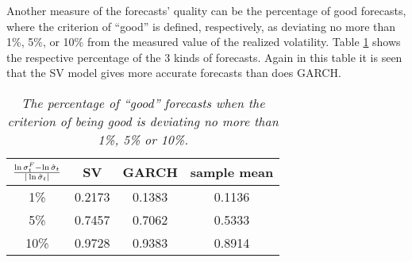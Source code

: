 Another measure of the forecasts' quality can be the percentage of good
forecasts, where the criterion of ``good'' is defined, respectively,
as deviating no more than 1\%, 5\%, or 10\% from the measured value of
the realized volatility. Table \ref{tab:nordea_2012_good} shows the
respective percentage of the 3 kinds of forecasts. Again in this table
it is seen that the SV model gives more accurate forecasts than does
GARCH.
\begin{table}[htb!]
  \centering
  \begin{tabular}{|c|c|c|c|}
    \hline
    ${\ln \sigma^F_t - \ln \hat{\sigma}_t \over |\ln \hat{\sigma}_t|}$
    & SV & GARCH & sample mean \\
    \hline
    1\% & 0.2173 & 0.1383 & 0.1136 \\
    \hline
    5\% & 0.7457 & 0.7062 & 0.5333 \\
    \hline
    10\% & 0.9728 & 0.9383 & 0.8914 \\
    \hline
  \end{tabular}
  \caption{\small \it The percentage of ``good'' forecasts when the
    criterion of being good is deviating no more than 1\%, 5\% or
    10\%.}
  \label{tab:nordea_2012_good}
\end{table}
